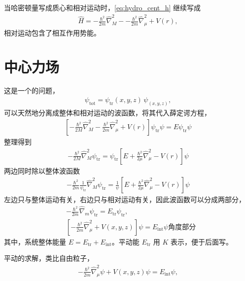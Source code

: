 当哈密顿量写成质心和相对运动时，\eqref{eq:hydro_cent_h} 继续写成
\begin{align}
    \hat H = -\frac{\hbar^2}{2m} \hat \nabla_M^2 -
    -\frac{\hbar^2}{2m} \hat \nabla_\mu^2 + V(r),
\end{align}
相对运动包含了相互作用势能。


\section{中心力场}
这是一个的问题，
\begin{align}
    \psi_{\mathrm{tot}} = \psi_{\mathrm{tr}}(x,y,z) \,\psi_(x,y,z),
\end{align}
可以天然地分离成整体和相对运动的波函数，将其代入薛定谔方程，
\begin{align}
    \left[
        -\frac{\hbar^2}{2M}\hat\nabla_M^2 - \frac{\hbar^2}{2m} \hat\nabla_\mu^2 + V(r) 
    \right] \psi_{\mathrm{tr}} \psi = E \psi_{\mathrm{tr}} \psi
\end{align}
整理得到
\begin{align}
    - \frac{\hbar^2}{2M}\hat\nabla_M^2 \psi_{\mathrm{tr}} = \psi_{\mathrm{tr}} \left[
        E + \frac{\hbar^2}{2\mu}\hat\nabla_\mu^2 - V(r)
    \right]\psi
\end{align}
两边同时除以整体波函数
\begin{align}
    -\frac{\hbar^2}{2m} \frac1{\psi_{\mathrm{tr}}} \hat\nabla_M^2 \psi_{\mathrm{tr}} = \frac1{\psi} \left[
        E + \frac{\hbar^2}{2\mu}\hat\nabla_\mu^2 - V(r)
    \right]\psi
\end{align}
左边只与整体运动有关，右边只与相对运动有关，因此波函数可以分成两部分，
\begin{align}
    & - \frac{\hbar^2}{2m} \hat \nabla_m \psi_{\mathrm{tr}} = E_\mathrm{tr} \psi_{\mathrm{tr}}, 
    \label{eq:hydro_Htr}
    \\
    & \left[-\frac{\hbar^2}{2m} \hat\nabla_\mu^2 + V(x,y,z)\right] \psi = E_\mathrm{int} \psi
    \label{eq:hydro_Hint}
    角度部分\end{align}
其中，系统整体能量 $E = E_{\mathrm{tr}} + E_{\mathrm{int}}$。平动能 $E_{\mathrm{tr}}$ 用 $K$ 表示，便于后面写。

平动的求解，类比自由粒子，
\begin{align}
    -\frac{\hbar^2}{2m} \hat\nabla_\mu^2 \psi + V(x,y,z) \psi = E_\mathrm{int} \psi, 
\end{align}

